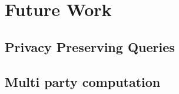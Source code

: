 \chapter{Future Work}
\label{future_work}

\section{Privacy Preserving Queries}
\label{future_work:ppq}

\section{Multi party computation}
\label{future_work:mpc}
